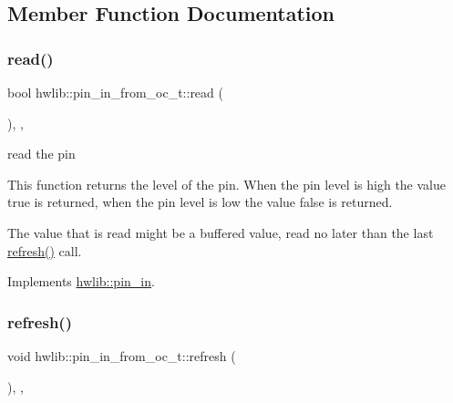 \subsection{Member Function Documentation}
\mbox{\label{classhwlib_1_1pin__in__from__oc__t_a451b54793f3bfb713bd90edb115c9ef2}} 
\subsubsection{\texorpdfstring{read()}{read()}}
{\footnotesize\ttfamily bool hwlib\+::pin\+\_\+in\+\_\+from\+\_\+oc\+\_\+t\+::read (\begin{DoxyParamCaption}{ }\end{DoxyParamCaption})\hspace{0.3cm}{\ttfamily [inline]}, {\ttfamily [override]}, {\ttfamily [virtual]}}





read the pin

This function returns the level of the pin. When the pin level is high the value true is returned, when the pin level is low the value false is returned.

The value that is read might be a buffered value, read no later than the last \hyperlink{classhwlib_1_1pin__in__from__oc__t_a2c0103a43cb2c3d65d944a645a54a8c6}{refresh()} call. 

Implements \hyperlink{classhwlib_1_1pin__in_ad071bd2e17bb4af51390f6cbb728a194}{hwlib\+::pin\+\_\+in}.

\mbox{\label{classhwlib_1_1pin__in__from__oc__t_a2c0103a43cb2c3d65d944a645a54a8c6}} 
\subsubsection{\texorpdfstring{refresh()}{refresh()}}
{\footnotesize\ttfamily void hwlib\+::pin\+\_\+in\+\_\+from\+\_\+oc\+\_\+t\+::refresh (\begin{DoxyParamCaption}{ }\end{DoxyParamCaption})\hspace{0.3cm}{\ttfamily [inline]}, {\ttfamily [override]}, {\ttfamily [virtual]}}





